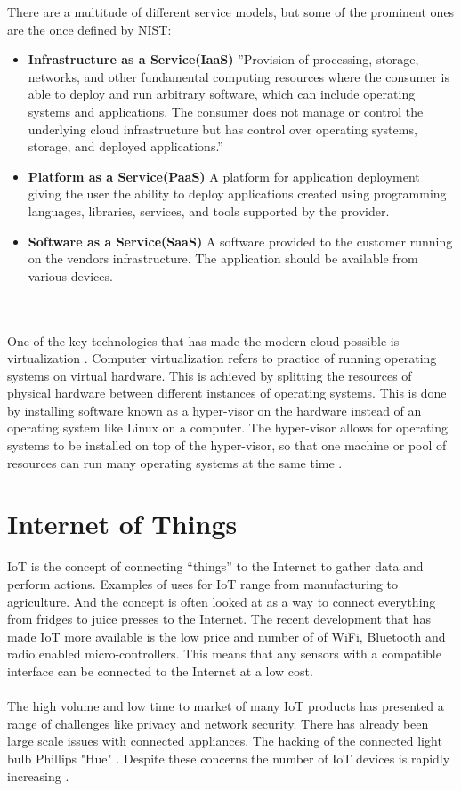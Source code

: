 \documentclass[]{uiophd}
\begin{document}
There are a multitude of different service models, but some of the prominent ones are the once defined by NIST:
\begin{itemize}
\item \textbf{Infrastructure as a Service(IaaS)} ''Provision of processing, storage, networks, and other fundamental computing resources where the consumer is able to deploy and run arbitrary software, which can include operating systems and applications. The consumer does not manage or control the underlying cloud infrastructure but has control over operating systems, storage, and deployed applications.''\cite{Mell:2011:SND:2206223}
\item \textbf{Platform as a Service(PaaS)} A platform for application deployment giving the user the ability to deploy applications created using programming languages, libraries, services, and tools supported by the provider.
\item \textbf{Software as a Service(SaaS)} A software provided to the customer running on the vendors infrastructure. The application should be available from various devices.
\end{itemize}
\\\\
One of the key technologies that has made the modern cloud possible is virtualization \cite{virt}. Computer virtualization refers to practice of running operating systems on virtual hardware. This is achieved by splitting the resources of physical hardware between different instances of operating systems. This is done by installing software known as a hyper-visor on the hardware instead of an operating system like Linux on a computer. The hyper-visor allows for operating systems to be installed on top of the hyper-visor, so that one machine or pool of resources can run many operating systems at the same time \cite{1430631}.


\section{Internet of Things}
IoT is the concept of connecting “things” to the Internet to gather data and perform actions. Examples of uses for IoT range from manufacturing to agriculture. And the concept is often looked at as a way to connect everything from fridges to juice presses to the Internet. The recent development that has made IoT more available is the low price and number of of WiFi, Bluetooth and radio enabled micro-controllers. This means that any sensors with a compatible interface can be connected to the Internet at a low cost.
\\\\
The high volume and low time to market of many IoT products has presented a range of challenges like privacy and network security. There has already been large scale issues with connected appliances. The hacking of the connected light bulb Phillips "Hue" \cite{6997469}. Despite these concerns the number of IoT devices is rapidly increasing \cite{ericsson}.
\end{document}
